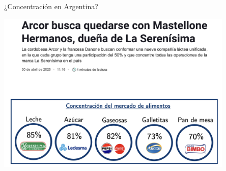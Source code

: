 \documentclass{beamer}
\begin{document}
    
\begin{frame}{¿Concentración en Argentina?}
    
    \centering
    \includegraphics[width=0.85\textwidth]{../Figures/M15.4.jpg}
    
\end{frame}
\end{document}
